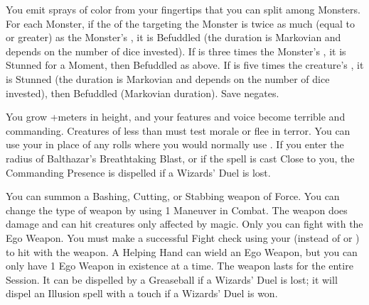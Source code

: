 {\SPELL[
  Name=Color Spray,
  Link=wizardry-color-spray,
  Paradigm=Mind,
  Save=Y (negate),
  Duration=0 / Markovian,
  Counter=n/a ,
  Keywords=Splittable,
  Target=Close or Nearby Monster(s)
]



You emit \DICE sprays of color from your fingertips that you can split among
\DICE Monsters.  For each Monster, if the \SUMDICE of the \DICE targeting
the Monster is twice as much (equal to or greater) as the Monster's \HD, it
is Befuddled (the duration is Markovian and depends on the number of dice
invested).  If \SUMDICE is three times the Monster's \HD, it is Stunned for
a Moment, then Befuddled as above. If \SUMDICE is five times the creature's
\HD, it is Stunned (the duration is Markovian and depends on the number of
dice invested), then Befuddled (Markovian duration).  Save negates.





\SPELL[
  Name=Commanding Presence,
  Link=wizardry-commanding-presence,
  Paradigm=Mind,
  Save=N,
  Duration=Combat or \SUMDICE Minutes,
  Counter=\mylink{Balthazar's Breathtaking Blast}{wizardry-balthazars-breathtaking-blast} ,
  Keywords=None,
  Target=Self
]



You grow +\DICE meters in height, and your features and voice become
terrible and commanding.  Creatures of less than \DICE \HD must test morale
or flee in terror.  You can use your \INT in place of any rolls where you
would normally use \VIG.  If you enter the radius of Balthazar's
Breathtaking Blast, or if the spell is cast Close to you, the Commanding
Presence is dispelled if a Wizards' Duel is lost.




\SPELL[
  Name=Ego Weapon,
  Link=wizardry-ego-weapon,
  Paradigm=Mind,
  Save=N,
  Duration=Session,
  Counter=\mylink{Greaseball}{wizardry-greaseball} ,
  Keywords=None,
  Target=Self
]



You can summon a Bashing, Cutting, or Stabbing weapon of Force.  You can
change the type of weapon by using 1 Maneuver in Combat.  The weapon does
\DICE damage and can hit creatures only affected by magic.  Only you can
fight with the Ego Weapon.   You must make a successful
Fight check using your \INT (instead of \VIG or \DEX) to hit with the weapon. 
A Helping Hand can wield an Ego Weapon, but you can only have 1 Ego Weapon
in existence at a time.  The weapon lasts for the entire Session.  It can be
dispelled by a Greaseball if a Wizards' Duel is lost; it will dispel an
Illusion spell with a touch if a Wizards' Duel is won.





}
